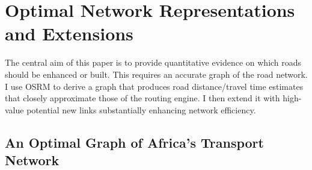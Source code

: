 \documentclass[a4paper]{article}
\begin{document}



\section{Optimal Network Representations and Extensions} \label{sec:netrep}

The central aim of this paper is to provide quantitative evidence on which roads should be enhanced or built. This requires an accurate graph of the road network. I use OSRM to derive a graph that produces road distance/travel time estimates that closely approximate those of the routing engine. I then extend it with high-value potential new links substantially enhancing network efficiency. 


\subsection{An Optimal Graph of Africa's Transport Network} \label{ss:OTN}
\end{document}
